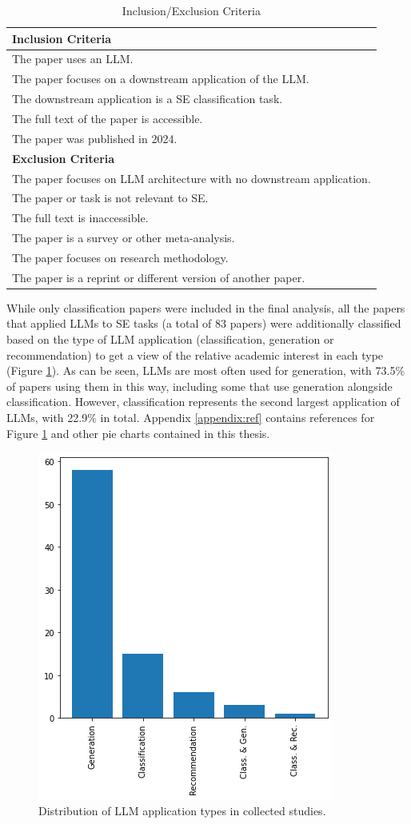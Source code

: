 \documentclass[a4paper]{article}
\begin{document}
\begin{table}[H]
	\caption{Inclusion/Exclusion Criteria}
	\begin{tabularx}{\textwidth}{|X|} \hline
		\textbf{Inclusion Criteria} \\ \hline
		The paper uses an LLM.  \\
		The paper focuses on a downstream application of the LLM. \\
		The downstream application is a SE classification task. \\
		The full text of the paper is accessible. \\
		The paper was published in 2024. \\ \hline
		\textbf{Exclusion Criteria} \\ \hline
		The paper focuses on LLM architecture with no downstream application. \\
		The paper or task is not relevant to SE. \\
		The full text is inaccessible. \\
		The paper is a survey or other meta-analysis. \\
		The paper focuses on research methodology. \\
		The paper is a reprint or different version of another paper. \\ \hline
	\end{tabularx}
	
	\label{table:criteria}
\end{table}

While only classification papers were included in the final analysis, all the papers that applied LLMs to SE tasks (a total of 83 papers) were additionally classified based on the type of LLM application (classification, generation or recommendation) to get a view of the relative academic interest in each type (Figure \ref{fig:LLMTypes}). As can be seen, LLMs are most often used for generation, with 73.5\% of papers using them in this way, including some that use generation alongside classification. However, classification represents the second largest application of LLMs, with 22.9\% in total. Appendix \ref{appendix:ref} contains references for Figure \ref{fig:LLMTypes} and other pie charts contained in this thesis.

\begin{figure}[h]
	\includegraphics[width=0.5\linewidth]{figures/LLMTypes.png}
	\caption{Distribution of LLM application types in collected studies.}
	\label{fig:LLMTypes}
\end{figure}
\end{document}
